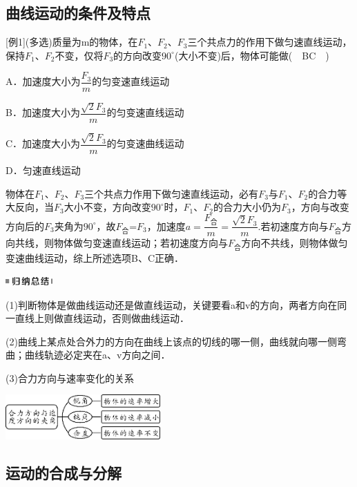 \documentclass[cn,10.5pt,chinese,mac,chinesefont=founder]{elegantbook}
\begin{document}
\newpage
\subsection{曲线运动的条件及特点}

{[}例1{]}(多选)质量为m的物体，在$F_1$、$F_2$、$F_3$三个共点力的作用下做匀速直线运动，保持$F_1$、$F_2$不变，仅将$F_3$的方向改变$90^\circ$(大小不变)后，物体可能做(　BC　)

A．加速度大小为$\dfrac{F_3}{m}$的匀变速直线运动

B．加速度大小为$\dfrac{\sqrt{2}F_3}{m}$的匀变速直线运动

C．加速度大小为$\dfrac{\sqrt{2}F_3}{m}$的匀变速曲线运动

D．匀速直线运动
\begin{solution}
	物体在$F_1$、$F_2$、$F_3$三个共点力作用下做匀速直线运动，必有$F_3$与$F_1$、$F_2$的合力等大反向，当$F_3$大小不变，方向改变$90^\circ$时，$F_1$、$F_2$的合力大小仍为$F_3$，方向与改变方向后的$F_3$夹角为$90^\circ$，故$F_{\text{合}}$=$F_3$，加速度$a=\dfrac{F_{\text{合}}}{m}=\dfrac{\sqrt{2}F_3}{m}$.若初速度方向与$F_{\text{合}}$方向共线，则物体做匀变速直线运动；若初速度方向与$F_{\text{合}}$方向不共线，则物体做匀变速曲线运动，综上所述选项B、C正确．
\end{solution}


\begin{center}\includegraphics[width=0.70833in,height=0.125in]{media/image13.png}\end{center}

(1)判断物体是做曲线运动还是做直线运动，关键要看a和v的方向，两者方向在同一直线上则做直线运动，否则做曲线运动．

(2)曲线上某点处合外力的方向在曲线上该点的切线的哪一侧，曲线就向哪一侧弯曲；曲线轨迹必定夹在a、v方向之间．

(3)合力方向与速率变化的关系

\begin{center}\includegraphics[width=2.33333in,height=0.67708in]{media/image142.png}\end{center}
\newpage
\subsection{运动的合成与分解}
\end{document}
